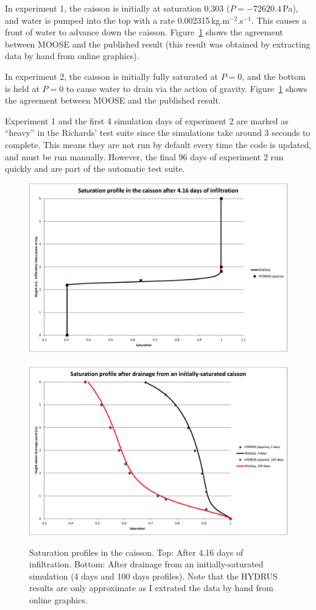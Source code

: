\documentclass[]{scrreprt}
\begin{document}
In experiment 1, the caisson is initially at saturation 0.303
($P=-72620.4$\,Pa), and water is pumped into the top with a rate
0.002315\,kg.m$^{-2}$.s$^{-1}$.  This causes a front of water to
advance down the caisson.  Figure~\ref{rd.result.fig} shows the
agreement between MOOSE and the published result (this result was
obtained by extracting data by hand from online graphics).

In experiment 2, the caisson is initially fully saturated at $P=0$,
and the bottom is held at $P=0$ to cause water to drain via the action
of gravity.  Figure~\ref{rd.result.fig} shows the agreement between
MOOSE and the published result.

Experiment 1 and the first 4 simulation days of experiment 2 are
marked as ``heavy'' in the Richards' test suite since the simulations
take around 3 seconds to complete.  This means they are not run by
default every time the code is updated, and must be run manually.
However, the final 96 days of experiment 2 run quickly and are part of
the automatic test suite.


\begin{figure}[htb]
\begin{center}
\includegraphics[width=12cm]{rd01.eps} \\
$\mbox{}$\\
\includegraphics[width=12cm]{rd02.eps}
\caption{Saturation profiles in the caisson.  Top: After 4.16 days of
  infiltration.  Bottom: After drainage from an initially-saturated
  simulation (4 days and 100 days profiles).  Note that the HYDRUS
  results are only approximate as I extrated the data by hand from
  online graphics.}
\label{rd.result.fig}
\end{center}
\end{figure}
\end{document}
